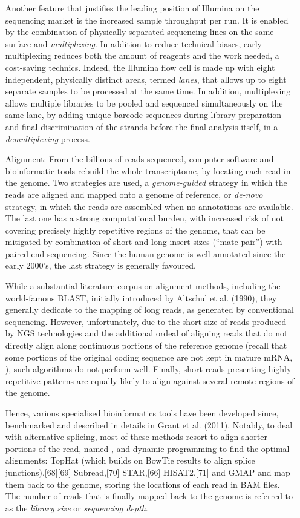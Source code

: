 \begin{enumerate}[label=(\roman*)]
    Another feature that justifies the leading position of Illumina on the sequencing market is the increased sample throughput per run. It is enabled by the combination of physically separated sequencing lines on the same surface and \textit{multiplexing}. In addition to reduce technical biases, early multiplexing reduces both the amount of reagents and the work needed, a cost-saving technics. Indeed, the Illumina flow cell is made up with eight independent, physically distinct areas, termed \textit{lanes}, that allows up to eight separate samples to be processed at the same time. In addition,  multiplexing allows multiple libraries to be pooled and sequenced simultaneously on the same lane, by adding unique barcode sequences during library preparation and final discrimination of the strands before the final analysis itself, in a \textit{demultiplexing} process.
    
    \item[Alignment:]  From the billions of reads sequenced, computer software and bioinformatic tools rebuild the whole transcriptome, by locating each read in the genome. Two strategies are used, a \textit{genome-guided} strategy in which the reads are aligned and mapped onto a genome of reference, or \textit{de-novo} strategy, in which the reads are assembled when no annotations are available. The last one has a strong computational burden, with increased risk of not covering precisely highly repetitive regions of the genome, that can be mitigated by combination of short and long insert sizes (\enquote{mate pair}) with paired-end sequencing. Since the human genome is well annotated since the early 2000's, the last strategy is generally favoured. 

    While a substantial literature corpus on alignment methods, including the world-famous BLAST, initially introduced by Altschul et al. (1990), they generally dedicate to the mapping of long reads, as generated by conventional sequencing. However, unfortunately, due to the short size of reads produced by NGS technologies and the additional ordeal of aligning reads that do not directly align along continuous portions of the reference genome (recall that some portions of the original coding sequence are not kept in mature mRNA, ), such algorithms do not perform well. Finally, short reads presenting highly-repetitive patterns are equally likely to align against several remote regions of the genome. 
    
    Hence, various specialised bioinformatics tools have been developed since, benchmarked and described in details in Grant et al. (2011). Notably, to deal with alternative splicing, most of these methods resort to align shorter portions of the read, named , and dynamic programming to find the optimal alignments: TopHat (which builds on BowTie results to align splice junctions),[68][69] Subread,[70] STAR,[66] HISAT2,[71] and GMAP and map them back to the genome, storing the locations of each read in BAM files. The number of reads that is finally mapped back to the genome is referred to as the \textit{library size} or \textit{sequencing depth}.
    

\end{enumerate}
